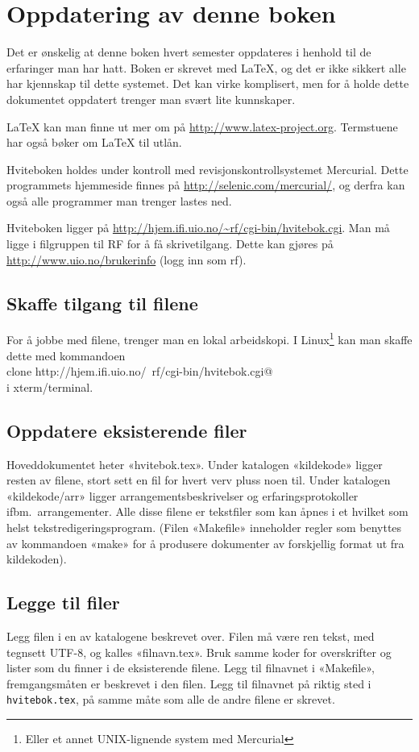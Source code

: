 \documentclass[11pt,norsk,a4paper,pointlessnumbers]{scrbook}
\begin{document}
\appendix

\chapter{Oppdatering av denne boken}
Det er ønskelig at denne boken hvert semester oppdateres i henhold til
de erfaringer man har hatt. Boken er skrevet med \LaTeX, og det er ikke
sikkert alle har kjennskap til dette systemet. Det kan virke komplisert,
men for å holde dette dokumentet oppdatert trenger man svært lite
kunnskaper.

\LaTeX{} kan man finne ut mer om på \url{http://www.latex-project.org}.
Termstuene har også bøker om \LaTeX{} til utlån.

Hviteboken holdes under kontroll med revisjonskontrollsystemet Mercurial.
Dette programmets hjemmeside finnes på \url{http://selenic.com/mercurial/}, og
derfra kan også alle programmer man trenger lastes ned.

Hviteboken ligger på \url{http://hjem.ifi.uio.no/~rf/cgi-bin/hvitebok.cgi}.
Man må ligge i filgruppen til RF for å få skrivetilgang. Dette kan gjøres
på \url{http://www.uio.no/brukerinfo} (logg inn som rf).

\section{Skaffe tilgang til filene}
For å jobbe med filene, trenger man en lokal arbeidskopi. I
Linux\footnote{Eller et annet UNIX-lignende system med Mercurial} kan man
skaffe dette med kommandoen\\
\verb@hg clone http://hjem.ifi.uio.no/~rf/cgi-bin/hvitebok.cgi@\\
i xterm/terminal.

\section{Oppdatere eksisterende filer}
Hoveddokumentet heter «hvitebok.tex». Under katalogen «kildekode» ligger
resten av filene, stort sett en fil for hvert verv pluss noen til.
Under katalogen «kildekode/arr» ligger arrangementsbeskrivelser og
erfaringsprotokoller ifbm.~arrangementer. Alle disse filene er tekstfiler
som kan åpnes i et hvilket som helst tekstredigeringsprogram.
(Filen «Makefile» inneholder regler som benyttes av kommandoen «make»
for å produsere dokumenter av forskjellig format ut fra kildekoden).

\section{Legge til filer}
Legg filen i en av katalogene beskrevet over. Filen må være ren tekst, med
tegnsett UTF-8, og kalles «filnavn.tex». Bruk samme koder for overskrifter
og lister som du finner i de eksisterende filene. Legg til filnavnet i
«Makefile», fremgangsmåten er beskrevet i den filen.
Legg til filnavnet på riktig sted i \verb|hvitebok.tex|, på samme måte som alle
de andre filene er skrevet.
\end{document}
